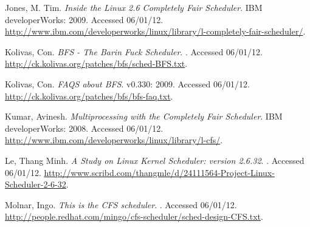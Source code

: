 \documentclass[12pt]{article}
\begin{document}
\renewcommand{\refname}{\section{References}}
\begin{thebibliography}{3}

 Jones, M. Tim.
  \newblock \emph{Inside the Linux 2.6 Completely Fair Scheduler}.
  \newblock IBM developerWorks: 2009.
  \newblock Accessed 06/01/12.
  \newblock \url{http://www.ibm.com/developerworks/linux/library/l-completely-fair-scheduler/}.

 Kolivas, Con.
  \newblock \emph{BFS - The Barin Fuck Scheduler}.
  .
  \newblock Accessed 06/01/12.
  \newblock \url{http://ck.kolivas.org/patches/bfs/sched-BFS.txt}.

 Kolivas, Con.
  \newblock \emph{FAQS about BFS}.
  \newblock v0.330: 2009.
  \newblock Accessed 06/01/12.
  \newblock \url{http://ck.kolivas.org/patches/bfs/bfs-faq.txt}.

 Kumar, Avinesh.
  \newblock \emph{Multiprocessing with the Completely Fair Scheduler}.
  \newblock IBM developerWorks: 2008.
  \newblock Accessed 06/01/12.
  \newblock \url{http://www.ibm.com/developerworks/linux/library/l-cfs/}.

 Le, Thang Minh.
  \newblock \emph{A Study on Linux Kernel Scheduler: version 2.6.32}.
  .
  \newblock Accessed 06/01/12.
  \newblock \url{http://www.scribd.com/thangmle/d/24111564-Project-Linux-Scheduler-2-6-32}.

 Molnar, Ingo.
  \newblock \emph{This is the CFS scheduler}.
  .
  \newblock Accessed 06/01/12.
  \newblock \url{http://people.redhat.com/mingo/cfs-scheduler/sched-design-CFS.txt}.

\end{thebibliography}
\end{document}
